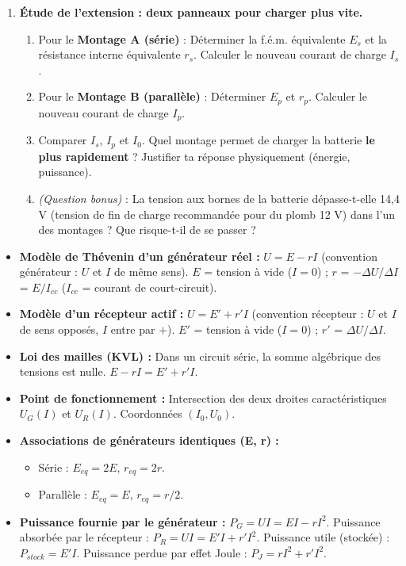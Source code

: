 \documentclass[11pt]{article}
\newcommand{\cle}[1]{{\popxbold\color{popdark}#1}}
\newcounter{popsec}
\newcounter{popsub}
\newcommand{\courssub}[1]{%
  \stepcounter{popsub}%
  \par\vspace{9pt}\noindent{\popxbold\fontsize{11.5}{13}\selectfont\color{popink}{\color{poporange}\thepopsec.\thepopsub}\hspace{6pt}#1}\par\nopagebreak\vspace{4pt}
}
\begin{document}
\begin{enumerate}
    \item \textbf{Étude de l'extension : deux panneaux pour charger plus vite.}
    \begin{enumerate}
        \item Pour le \textbf{Montage A (série)} : Déterminer la f.é.m. équivalente \cle{$E_s$} et la résistance interne équivalente \cle{$r_s$}. Calculer le nouveau courant de charge \cle{$I_s$}.
        \item Pour le \textbf{Montage B (parallèle)} : Déterminer \cle{$E_p$} et \cle{$r_p$}. Calculer le nouveau courant de charge \cle{$I_p$}.
        \item Comparer \cle{$I_s$}, \cle{$I_p$} et \cle{$I_0$}. Quel montage permet de charger la batterie \textbf{le plus rapidement} ? Justifier ta réponse physiquement (énergie, puissance).
        \item \textit{(Question bonus)} : La tension aux bornes de la batterie dépasse-t-elle 14,4 V (tension de fin de charge recommandée pour du plomb 12 V) dans l'un des montages ? Que risque-t-il de se passer ?
    \end{enumerate}
\end{enumerate}

\courssub{Ressources à mobiliser}
\begin{itemize}
    \item \textbf{Modèle de Thévenin d'un générateur réel :} \cle{$U = E - r I$} (convention générateur : \cle{$U$} et \cle{$I$} de même sens). \cle{$E$} = tension à vide (\cle{$I=0$}) ; \cle{$r$} = \cle{$-\Delta U / \Delta I$} = \cle{$E / I_{cc}$} (\cle{$I_{cc}$} = courant de court-circuit).
    \item \textbf{Modèle d'un récepteur actif :} \cle{$U = E' + r' I$} (convention récepteur : \cle{$U$} et \cle{$I$} de sens opposés, \cle{$I$} entre par \cle{$+$}). \cle{$E'$} = tension à vide (\cle{$I=0$}) ; \cle{$r'$} = \cle{$\Delta U / \Delta I$}.
    \item \textbf{Loi des mailles (KVL) :} Dans un circuit série, la somme algébrique des tensions est nulle. \cle{$E - r I = E' + r' I$}.
    \item \textbf{Point de fonctionnement :} Intersection des deux droites caractéristiques \cle{$U_G(I)$} et \cle{$U_R(I)$}. Coordonnées \cle{$(I_0, U_0)$}.
    \item \textbf{Associations de générateurs identiques (E, r) :}
    \begin{itemize}
        \item Série : \cle{$E_{eq} = 2E$}, \cle{$r_{eq} = 2r$}.
        \item Parallèle : \cle{$E_{eq} = E$}, \cle{$r_{eq} = r/2$}.
    \end{itemize}
    \item \textbf{Puissance fournie par le générateur :} \cle{$P_G = U I = E I - r I^2$}. Puissance absorbée par le récepteur : \cle{$P_R = U I = E' I + r' I^2$}. Puissance utile (stockée) : \cle{$P_{stock} = E' I$}. Puissance perdue par effet Joule : \cle{$P_J = r I^2 + r' I^2$}.
\end{itemize}
\end{document}
